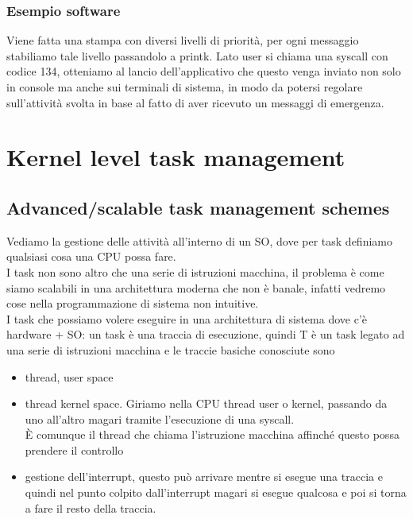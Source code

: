 \documentclass[12pt, oneside]{extbook}
\begin{document}
\subsection{Esempio software}
Viene fatta una stampa con diversi livelli di priorità, per ogni messaggio stabiliamo tale livello passandolo a printk. Lato user si chiama una syscall con codice 134, otteniamo al lancio dell'applicativo che questo venga inviato non solo in console ma anche sui terminali di sistema, in modo da potersi regolare sull'attività svolta in base al fatto di aver ricevuto un messaggi di emergenza.
\chapter{Kernel level task management}
\section{Advanced/scalable task management schemes}
Vediamo la gestione delle attività all'interno di un SO, dove per task definiamo qualsiasi cosa una CPU possa fare.\\I task non sono altro che una serie di istruzioni macchina, il problema è come siamo scalabili in una architettura moderna che non è banale, infatti vedremo cose nella programmazione di sistema non intuitive.\\I task che possiamo volere eseguire in una architettura di sistema dove c'è hardware + SO: un task è una traccia di esecuzione, quindi T è un task legato ad una serie di istruzioni macchina e le traccie basiche conosciute sono
\begin{itemize}
\item thread, user space 
\item thread kernel space. Giriamo nella CPU thread user o kernel, passando da uno  all'altro magari tramite l'esecuzione di una syscall.\\È comunque il thread che chiama l'istruzione macchina affinché questo possa prendere il controllo
\item gestione dell'interrupt, questo può arrivare mentre si esegue una traccia e quindi nel punto colpito dall'interrupt magari si esegue qualcosa e poi si torna a fare il resto della traccia.
\end{itemize}
\end{document}

